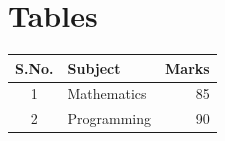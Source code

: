 \documentclass{article}
\begin{document}
\section{Tables}
\begin{tabular}{|c|l|r|}
\hline
S.No. & Subject & Marks\\ \hline
1 & Mathematics & 85\\
2 & Programming & 90\\ \hline
\end{tabular}
\end{document}
